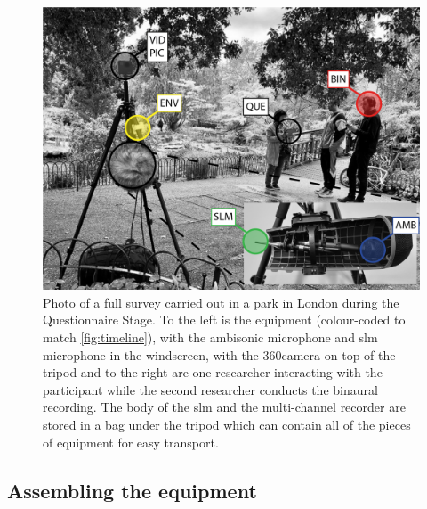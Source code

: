  \begin{figure}[h]
   \centering
   \includegraphics[width=\textwidth]{Figures/RegentsParkSurvey_V2-2}
   \caption{Photo of a full survey carried out in a park in London during the Questionnaire Stage. To the left is the equipment (colour-coded to match \cref{fig:timeline}), with the ambisonic microphone and \gls{slm} microphone in the windscreen, with the 360\degree camera on top of the tripod and to the right are one researcher interacting with the participant while the second researcher conducts the binaural recording. The body of the \gls{slm} and the multi-channel recorder are stored in a bag under the tripod which can contain all of the pieces of equipment for easy transport. \label{fig:survey-pic}}
 \end{figure}

 \subsection{Assembling the equipment}

